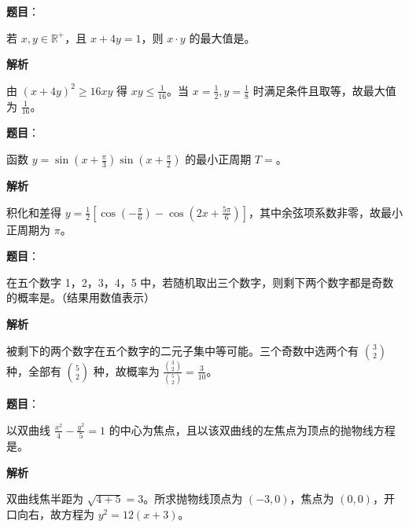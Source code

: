 \begin{answer}

\textbf{题目}：

若 $x,y\in\mathbb R^+$，且 $x+4y=1$，则 $x\cdot y$ 的最大值是\gkblank{}。

\textbf{解析}

由 $(x+4y)^2\ge16xy$ 得 $xy\le\frac1{16}$。当 $x=\frac12,y=\frac18$ 时满足条件且取等，故最大值为 $\frac1{16}$。


\end{answer}
\begin{answer}

\textbf{题目}：

函数 $y=\sin(x+\frac\pi3)\sin(x+\frac\pi2)$ 的最小正周期 $T=$\gkblank{}。

\textbf{解析}

积化和差得 $y=\frac12[\cos(-\frac\pi6)-\cos(2x+\frac{5\pi}6)]$，其中余弦项系数非零，故最小正周期为 $\pi$。


\end{answer}
\begin{answer}

\textbf{题目}：

在五个数字 1，2，3，4，5 中，若随机取出三个数字，则剩下两个数字都是奇数的概率是\gkblank{}。（结果用数值表示）

\textbf{解析}

被剩下的两个数字在五个数字的二元子集中等可能。三个奇数中选两个有 $\binom32$ 种，全部有 $\binom52$ 种，故概率为 $\frac{\binom32}{\binom52}=\frac3{10}$。


\end{answer}
\begin{answer}

\textbf{题目}：

以双曲线 $\frac{x^2}{4}-\frac{y^2}{5}=1$ 的中心为焦点，且以该双曲线的左焦点为顶点的抛物线方程是\gkblank{}。

\textbf{解析}

双曲线焦半距为 $\sqrt{4+5}=3$。所求抛物线顶点为 $(-3,0)$，焦点为 $(0,0)$，开口向右，故方程为 $y^2=12(x+3)$。


\end{answer}
